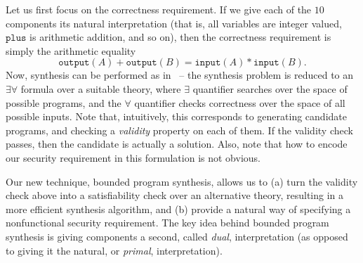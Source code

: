 \documentclass[preprint]{sig-alternate-05-2015}
\begin{document}
Let us first focus on the correctness requirement. If we give each of the $10$
components its natural interpretation (that is, all variables are 
integer valued, $\mathtt{plus}$ is arithmetic addition, and so on), 
then the correctness requirement is simply the arithmetic equality
$$\mathtt{output}(A) + \mathtt{output}(B) = \mathtt{input}(A)*\mathtt{input}(B).$$
Now, synthesis can be performed as in~\cite{bitvector} -- the synthesis problem
is reduced to an $\exists\forall$ formula over a suitable theory,
where $\exists$ quantifier searches over the space of possible programs,
and the $\forall$ quantifier checks correctness over the space of all possible
inputs. Note that, intuitively, this corresponds to 
generating candidate programs, and checking a {\em validity} property on
each of them. If the validity check passes, then the candidate is actually a solution.
Also, note that how to encode our security requirement in this formulation is not obvious.

Our new technique, bounded program synthesis, 
allows us to (a) turn the validity check above into a satisfiability
check over an alternative theory, resulting in a more efficient synthesis algorithm,
and (b) provide a natural way of specifying a nonfunctional security 
requirement. The key idea behind bounded program synthesis is
giving components a second, called {\em{dual}},
interpretation (as opposed to giving it the natural, or {\em{primal}}, interpretation).

\newcommand{\ttrule}[4]{{{#1}}: & \begin{array}{c}{#2}\\ \hline {#3}\end{array} &  {{#4}}}
\newcommand{\hoare}[3]{{\{{#1}\}\; {#2}\; \{{#3}\}}}
\end{document}
